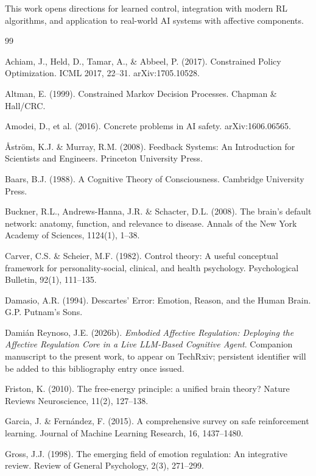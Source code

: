 \documentclass{article}
\begin{document}
This work opens directions for learned control, integration with modern RL algorithms, and application to real-world AI systems with affective components.

\begin{thebibliography}{99}

Achiam, J., Held, D., Tamar, A., \& Abbeel, P. (2017). Constrained Policy Optimization. ICML 2017, 22--31. arXiv:1705.10528.

Altman, E. (1999). Constrained Markov Decision Processes. Chapman \& Hall/CRC.

Amodei, D., et al. (2016). Concrete problems in AI safety. arXiv:1606.06565.

{\AA}str\"om, K.J. \& Murray, R.M. (2008). Feedback Systems: An Introduction for Scientists and Engineers. Princeton University Press.

Baars, B.J. (1988). A Cognitive Theory of Consciousness. Cambridge University Press.

Buckner, R.L., Andrews-Hanna, J.R. \& Schacter, D.L. (2008). The brain's default network: anatomy, function, and relevance to disease. Annals of the New York Academy of Sciences, 1124(1), 1--38.

Carver, C.S. \& Scheier, M.F. (1982). Control theory: A useful conceptual framework for personality-social, clinical, and health psychology. Psychological Bulletin, 92(1), 111--135.

Damasio, A.R. (1994). Descartes' Error: Emotion, Reason, and the Human Brain. G.P. Putnam's Sons.

Dami\'{a}n Reynoso, J.E. (2026b). \emph{Embodied Affective Regulation: Deploying the Affective Regulation Core in a Live LLM-Based Cognitive Agent}. Companion manuscript to the present work, to appear on TechRxiv; persistent identifier will be added to this bibliography entry once issued.

Friston, K. (2010). The free-energy principle: a unified brain theory? Nature Reviews Neuroscience, 11(2), 127--138.

Garcia, J. \& Fern\'andez, F. (2015). A comprehensive survey on safe reinforcement learning. Journal of Machine Learning Research, 16, 1437--1480.

Gross, J.J. (1998). The emerging field of emotion regulation: An integrative review. Review of General Psychology, 2(3), 271--299.


\end{thebibliography}
\end{document}
